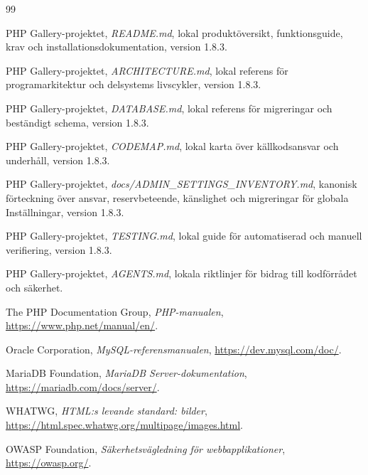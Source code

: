 \documentclass[11pt,a4paper]{article}
\newcommand{\version}{1.8.3}
\begin{document}
\begin{thebibliography}{99}

PHP Gallery-projektet, \emph{README.md}, lokal produktöversikt, funktionsguide,
krav och installationsdokumentation, version \version.

PHP Gallery-projektet, \emph{ARCHITECTURE.md}, lokal referens för
programarkitektur och delsystems livscykler, version \version.

PHP Gallery-projektet, \emph{DATABASE.md}, lokal referens för migreringar och
beständigt schema, version \version.

PHP Gallery-projektet, \emph{CODEMAP.md}, lokal karta över källkodsansvar och
underhåll, version \version.

PHP Gallery-projektet, \emph{docs/ADMIN\_SETTINGS\_INVENTORY.md}, kanonisk
förteckning över ansvar, reservbeteende, känslighet och migreringar för globala
Inställningar, version \version.

PHP Gallery-projektet, \emph{TESTING.md}, lokal guide för automatiserad och
manuell verifiering, version \version.

PHP Gallery-projektet, \emph{AGENTS.md}, lokala riktlinjer för bidrag till
kodförrådet och säkerhet.

The PHP Documentation Group, \emph{PHP-manualen},
\url{https://www.php.net/manual/en/}.

Oracle Corporation, \emph{MySQL-referensmanualen},
\url{https://dev.mysql.com/doc/}.

MariaDB Foundation, \emph{MariaDB Server-dokumentation},
\url{https://mariadb.com/docs/server/}.

WHATWG, \emph{HTML:s levande standard: bilder},
\url{https://html.spec.whatwg.org/multipage/images.html}.

OWASP Foundation, \emph{Säkerhetsvägledning för webbapplikationer},
\url{https://owasp.org/}.

\end{thebibliography}

\clearpage
{}
{}
\printindex
\end{document}
